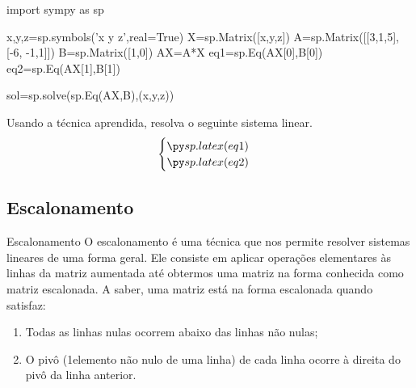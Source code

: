 \begin{frame}[label=sistemas,fragile=singleslide]
\begin{pycode}
import sympy as sp

x,y,z=sp.symbols('x y z',real=True)
X=sp.Matrix([x,y,z])
A=sp.Matrix([[3,1,5],[-6, -1,1]])
B=sp.Matrix([1,0])
AX=A*X
eq1=sp.Eq(AX[0],B[0])
eq2=sp.Eq(AX[1],B[1])

sol=sp.solve(sp.Eq(AX,B),(x,y,z))

\end{pycode}

\begin{casa}
Usando a técnica aprendida, resolva o seguinte sistema linear.
\[\begin{cases}
\pyl{eq1}\\
\pyl{eq2}
\end{cases}\]
\end{casa}

\end{frame}

\subsection*{Escalonamento}

\begin{frame}[label=sistemas]{Escalonamento}
O {\color{blue} escalonamento} é uma técnica que nos permite resolver sistemas lineares de uma forma geral. Ele consiste em aplicar operações elementares às linhas da matriz aumentada até obtermos uma matriz na forma conhecida como {\color{blue} matriz escalonada}. A saber, uma matriz está na forma {\color{blue}escalonada} quando satisfaz:
\begin{block}{}
\begin{enumerate}
\item Todas as linhas nulas ocorrem abaixo das linhas não nulas;
\item O {\color{blue} pivô} (1\mc elemento não nulo de uma linha) de cada linha ocorre à direita do pivô da linha anterior.
\end{enumerate}
\end{block}



\end{frame}

